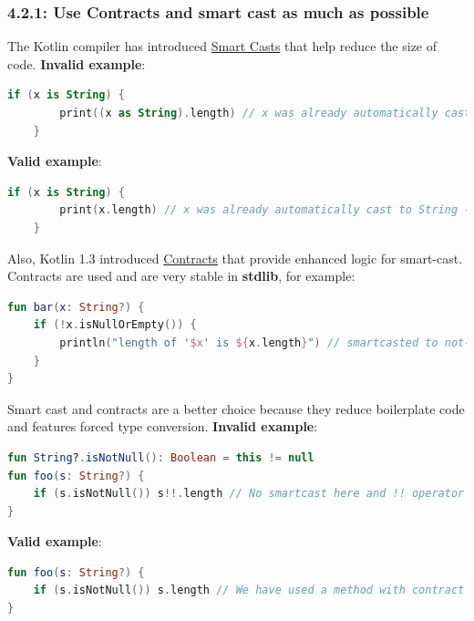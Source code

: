 \subsubsection*{\textbf{4.2.1: Use Contracts and smart cast as much as possible}}
\leavevmode\newline
\label{sec:4.2.1}
The Kotlin compiler has introduced \href{https://kotlinlang.org/docs/reference/typecasts.html#smart-casts}{Smart Casts} that help reduce the size of code.
\textbf{Invalid example}:
\begin{lstlisting}[language=Kotlin]
    if (x is String) {
        print((x as String).length) // x was already automatically cast to String - no need to use 'as' keyword here
    }
\end{lstlisting}
\textbf{Valid example}:
\begin{lstlisting}[language=Kotlin]
    if (x is String) {
        print(x.length) // x was already automatically cast to String - no need to use 'as' keyword here
    }
\end{lstlisting}
Also, Kotlin 1.3 introduced \href{https://kotlinlang.org/docs/reference/whatsnew13.html#contracts}{Contracts} that provide enhanced logic for smart-cast.
Contracts are used and are very stable in \textbf{stdlib}, for example:
 
\begin{lstlisting}[language=Kotlin]
fun bar(x: String?) {
    if (!x.isNullOrEmpty()) {
        println("length of '$x' is ${x.length}") // smartcasted to not-null
    }
} 
\end{lstlisting}
Smart cast and contracts are a better choice because they reduce boilerplate code and features forced type conversion.
\textbf{Invalid example}:
\begin{lstlisting}[language=Kotlin]
fun String?.isNotNull(): Boolean = this != null
fun foo(s: String?) {
    if (s.isNotNull()) s!!.length // No smartcast here and !! operator is used
}
\end{lstlisting}
\textbf{Valid example}:
\begin{lstlisting}[language=Kotlin]
fun foo(s: String?) {
    if (s.isNotNull()) s.length // We have used a method with contract from stdlib that helped compiler to execute smart cast
}
\end{lstlisting}
